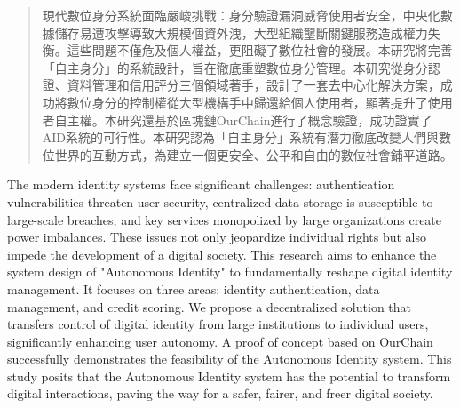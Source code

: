
\begin{abstract}
  現代數位身分系統面臨嚴峻挑戰：身分驗證漏洞威脅使用者安全，中央化數據儲存易遭攻擊導致大規模個資外洩，大型組織壟斷關鍵服務造成權力失衡。這些問題不僅危及個人權益，更阻礙了數位社會的發展。本研究將完善「自主身分」的系統設計，旨在徹底重塑數位身分管理。本研究從身分認證、資料管理和信用評分三個領域著手，設計了一套去中心化解決方案，成功將數位身分的控制權從大型機構手中歸還給個人使用者，顯著提升了使用者自主權。本研究還基於區塊鏈OurChain進行了概念驗證，成功證實了AID系統的可行性。本研究認為「自主身分」系統有潛力徹底改變人們與數位世界的互動方式，為建立一個更安全、公平和自由的數位社會鋪平道路。
\end{abstract}

\begin{abstract*}
  The modern identity systems face significant challenges: authentication vulnerabilities threaten user security, centralized data storage is susceptible to large-scale breaches, and key services monopolized by large organizations create power imbalances. These issues not only jeopardize individual rights but also impede the development of a digital society. This research aims to enhance the system design of "Autonomous Identity" to fundamentally reshape digital identity management. It focuses on three areas: identity authentication, data management, and credit scoring. We propose a decentralized solution that transfers control of digital identity from large institutions to individual users, significantly enhancing user autonomy. A proof of concept based on OurChain successfully demonstrates the feasibility of the Autonomous Identity system. This study posits that the Autonomous Identity system has the potential to transform digital interactions, paving the way for a safer, fairer, and freer digital society.
\end{abstract*}
